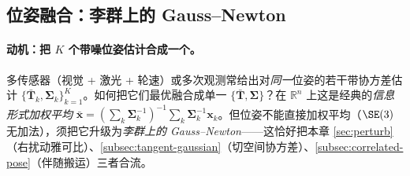 \subsection{位姿融合：李群上的 Gauss--Newton}
\label{subsec:pose-fusion}

\paragraph{动机：把 $K$ 个带噪位姿估计合成一个。}多传感器（视觉 + 激光 + 轮速）或多次观测常给出对\emph{同一}位姿的若干带协方差估计 $\{\bar{\mathbf{T}}_k,\boldsymbol{\Sigma}_k\}_{k=1}^K$。如何把它们最优融合成单一 $\{\bar{\mathbf{T}},\boldsymbol{\Sigma}\}$？在 $\mathbb{R}^n$ 上这是经典的\emph{信息形式加权平均} $\bar{\mathbf{x}}=(\sum_k\boldsymbol{\Sigma}_k^{-1})^{-1}\sum_k\boldsymbol{\Sigma}_k^{-1}\mathbf{x}_k$。但位姿不能直接加权平均（$\SE(3)$ 无加法），须把它升级为\emph{李群上的 Gauss--Newton}——这恰好把本章 \cref{sec:perturb}（右扰动雅可比）、\cref{subsec:tangent-gaussian}（切空间协方差）、\cref{subsec:correlated-pose}（伴随搬运）三者合流。

